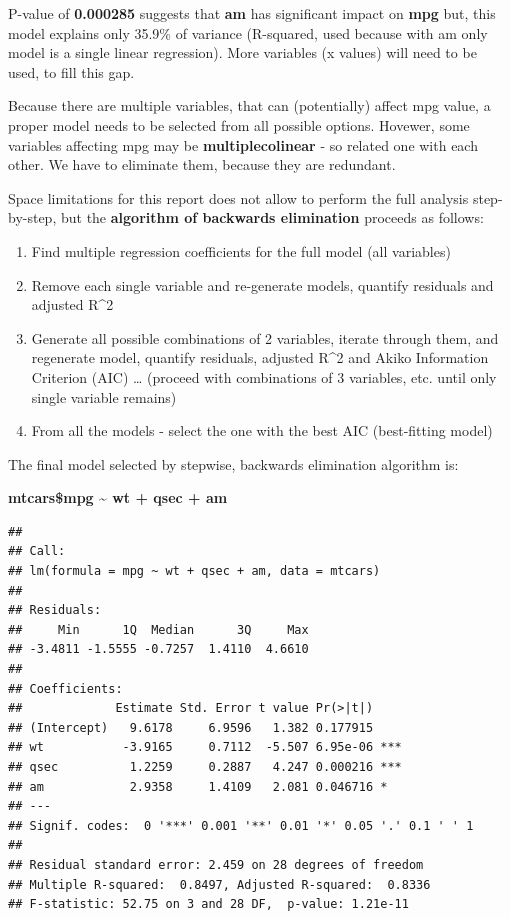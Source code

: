 \documentclass[10pt,]{article}
\newenvironment{Shaded}{\begin{snugshade}}{\end{snugshade}}
\newcommand{\KeywordTok}[1]{\textcolor[rgb]{0.13,0.29,0.53}{\textbf{{#1}}}}
\newcommand{\DataTypeTok}[1]{\textcolor[rgb]{0.13,0.29,0.53}{{#1}}}
\newcommand{\StringTok}[1]{\textcolor[rgb]{0.31,0.60,0.02}{{#1}}}
\newcommand{\NormalTok}[1]{{#1}}
\begin{document}
P-value of \textbf{0.000285} suggests that \textbf{am} has significant
impact on \textbf{mpg} but, this model explains only 35.9\% of variance
(R-squared, used because with am only model is a single linear
regression). More variables (x values) will need to be used, to fill
this gap.

Because there are multiple variables, that can (potentially) affect mpg
value, a proper model needs to be selected from all possible options.
Hovewer, some variables affecting mpg may be \textbf{multiplecolinear} -
so related one with each other. We have to eliminate them, because they
are redundant.

Space limitations for this report does not allow to perform the full
analysis step-by-step, but the \textbf{algorithm of backwards
elimination } proceeds as follows:

\begin{enumerate}
\def\labelenumi{\arabic{enumi}.}
\itemsep1pt\parskip0pt
\item
  Find multiple regression coefficients for the full model (all
  variables)
\item
  Remove each single variable and re-generate models, quantify residuals
  and adjusted R\^{}2
\item
  Generate all possible combinations of 2 variables, iterate through
  them, and regenerate model, quantify residuals, adjusted R\^{}2 and
  Akiko Information Criterion (AIC) \ldots{} (proceed with combinations
  of 3 variables, etc. until only single variable remains)
\item
  From all the models - select the one with the best AIC (best-fitting
  model)
\end{enumerate}

\begin{Shaded}
\end{Shaded}

The final model selected by stepwise, backwards elimination algorithm
is:

\textbf{mtcars\$mpg \textasciitilde{} wt + qsec + am}

\begin{verbatim}
## 
## Call:
## lm(formula = mpg ~ wt + qsec + am, data = mtcars)
## 
## Residuals:
##     Min      1Q  Median      3Q     Max 
## -3.4811 -1.5555 -0.7257  1.4110  4.6610 
## 
## Coefficients:
##             Estimate Std. Error t value Pr(>|t|)    
## (Intercept)   9.6178     6.9596   1.382 0.177915    
## wt           -3.9165     0.7112  -5.507 6.95e-06 ***
## qsec          1.2259     0.2887   4.247 0.000216 ***
## am            2.9358     1.4109   2.081 0.046716 *  
## ---
## Signif. codes:  0 '***' 0.001 '**' 0.01 '*' 0.05 '.' 0.1 ' ' 1
## 
## Residual standard error: 2.459 on 28 degrees of freedom
## Multiple R-squared:  0.8497, Adjusted R-squared:  0.8336 
## F-statistic: 52.75 on 3 and 28 DF,  p-value: 1.21e-11
\end{verbatim}
\end{document}
